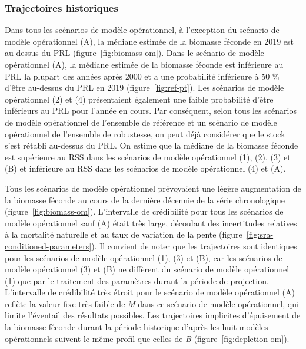 \documentclass[french,11pt]{book}
\begin{document}
\hypertarget{sec:approach3-conditioning-trajectories}{%
\subsubsection{Trajectoires historiques}\label{sec:approach3-conditioning-trajectories}}

Dans tous les scénarios de modèle opérationnel, à l'exception du scénario de modèle opérationnel (A), la médiane estimée de la biomasse féconde en 2019 est au-dessus du PRL (figure~\ref{fig:biomass-om}). Dans le scénario de modèle opérationnel (A), la médiane estimée de la biomasse féconde est inférieure au PRL la plupart des années après 2000 et a une probabilité inférieure à 50 \% d'être au-dessus du PRL en 2019 (figure~\ref{fig:ref-pt}). Les scénarios de modèle opérationnel (2) et (4) présentaient également une faible probabilité d'être inférieurs au PRL pour l'année en cours. Par conséquent, selon tous les scénarios de modèle opérationnel de l'ensemble de référence et un scénario de modèle opérationnel de l'ensemble de robustesse, on peut déjà considérer que le stock s'est rétabli au-dessus du PRL. On estime que la médiane de la biomasse féconde est supérieure au RSS dans les scénarios de modèle opérationnel (1), (2), (3) et (B) et inférieure au RSS dans les scénarios de modèle opérationnel (4) et (A).

Tous les scénarios de modèle opérationnel prévoyaient une légère augmentation de la biomasse féconde au cours de la dernière décennie de la série chronologique (figure~\ref{fig:biomass-om}). L'intervalle de crédibilité pour tous les scénarios de modèle opérationnel sauf (A) était très large, découlant des incertitudes relatives à la mortalité naturelle et au taux de variation de la pente (figure~\ref{fig:sra-conditioned-parameters}). Il convient de noter que les trajectoires sont identiques pour les scénarios de modèle opérationnel (1), (3) et (B), car les scénarios de modèle opérationnel (3) et (B) ne diffèrent du scénario de modèle opérationnel (1) que par le traitement des paramètres durant la période de projection. L'intervalle de crédibilité très étroit pour le scénario de modèle opérationnel (A) reflète la valeur fixe très faible de \emph{M} dans ce scénario de modèle opérationnel, qui limite l'éventail des résultats possibles. Les trajectoires implicites d'épuisement de la biomasse féconde durant la période historique d'après les huit modèles opérationnels suivent le même profil que celles de \emph{B} (figure~\ref{fig:depletion-om}).
\end{document}
